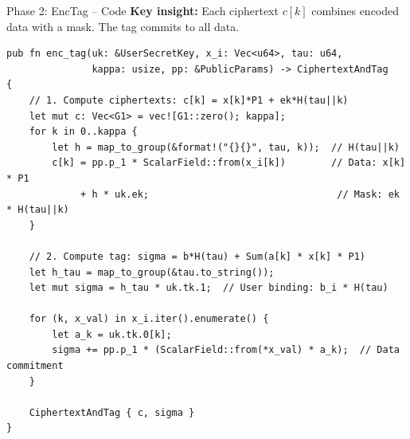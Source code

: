 \documentclass[aspectratio=169,10pt]{beamer}
\begin{document}
\begin{frame}[fragile]{Phase 2: EncTag -- Code}
    \textbf{Key insight:} Each ciphertext $c[k]$ combines encoded data with a mask. The tag commits to all data.

    \vspace{0.3em}
\begin{lstlisting}[style=rust]
pub fn enc_tag(uk: &UserSecretKey, x_i: Vec<u64>, tau: u64,
               kappa: usize, pp: &PublicParams) -> CiphertextAndTag
{
    // 1. Compute ciphertexts: c[k] = x[k]*P1 + ek*H(tau||k)
    let mut c: Vec<G1> = vec![G1::zero(); kappa];
    for k in 0..kappa {
        let h = map_to_group(&format!("{}{}", tau, k));  // H(tau||k)
        c[k] = pp.p_1 * ScalarField::from(x_i[k])        // Data: x[k] * P1
             + h * uk.ek;                                 // Mask: ek * H(tau||k)
    }

    // 2. Compute tag: sigma = b*H(tau) + Sum(a[k] * x[k] * P1)
    let h_tau = map_to_group(&tau.to_string());
    let mut sigma = h_tau * uk.tk.1;  // User binding: b_i * H(tau)

    for (k, x_val) in x_i.iter().enumerate() {
        let a_k = uk.tk.0[k];
        sigma += pp.p_1 * (ScalarField::from(*x_val) * a_k);  // Data commitment
    }

    CiphertextAndTag { c, sigma }
}
\end{lstlisting}
\end{frame}
\end{document}
